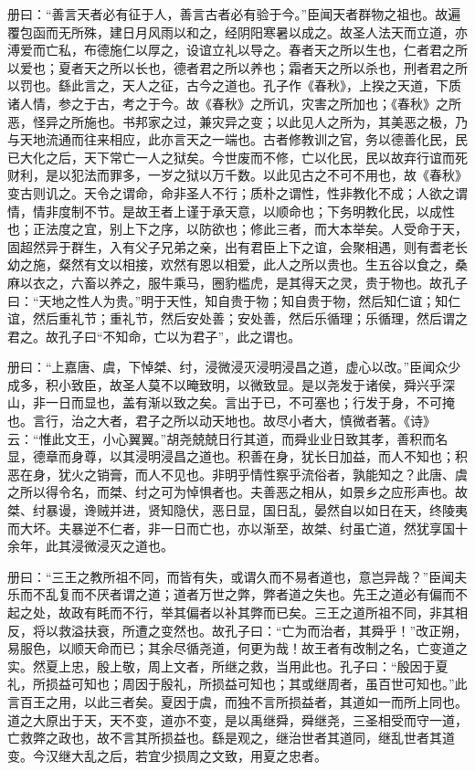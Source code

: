 \documentclass[]{article}
\begin{document}
册曰：``善言天者必有征于人，善言古者必有验于今。''臣闻天者群物之祖也。故遍覆包函而无所殊，建日月风雨以和之，经阴阳寒暑以成之。故圣人法天而立道，亦溥爱而亡私，布德施仁以厚之，设谊立礼以导之。春者天之所以生也，仁者君之所以爱也；夏者天之所以长也，德者君之所以养也；霜者天之所以杀也，刑者君之所以罚也。繇此言之，天人之征，古今之道也。孔子作《春秋》，上揆之天道，下质诸人情，参之于古，考之于今。故《春秋》之所讥，灾害之所加也；《春秋》之所恶，怪异之所施也。书邦家之过，兼灾异之变；以此见人之所为，其美恶之极，乃与天地流通而往来相应，此亦言天之一端也。古者修教训之官，务以德善化民，民已大化之后，天下常亡一人之狱矣。今世废而不修，亡以化民，民以故弃行谊而死财利，是以犯法而罪多，一岁之狱以万千数。以此见古之不可不用也，故《春秋》变古则讥之。天令之谓命，命非圣人不行；质朴之谓性，性非教化不成；人欲之谓情，情非度制不节。是故王者上谨于承天意，以顺命也；下务明教化民，以成性也；正法度之宜，别上下之序，以防欲也；修此三者，而大本举矣。人受命于天，固超然异于群生，入有父子兄弟之亲，出有君臣上下之谊，会聚相遇，则有耆老长幼之施，粲然有文以相接，欢然有恩以相爱，此人之所以贵也。生五谷以食之，桑麻以衣之，六畜以养之，服牛乘马，圈豹槛虎，是其得天之灵，贵于物也。故孔子曰：``天地之性人为贵。''明于天性，知自贵于物；知自贵于物，然后知仁谊；知仁谊，然后重礼节；重礼节，然后安处善；安处善，然后乐循理；乐循理，然后谓之君之。故孔子曰``不知命，亡以为君子''，此之谓也。

册曰：``上嘉唐、虞，下悼桀、纣，浸微浸灭浸明浸昌之道，虚心以改。''臣闻众少成多，积小致臣，故圣人莫不以晻致明，以微致显。是以尧发于诸侯，舜兴乎深山，非一日而显也，盖有渐以致之矣。言出于已，不可塞也；行发于身，不可掩也。言行，治之大者，君子之所以动天地也。故尽小者大，慎微者著。《诗》云：``惟此文王，小心翼翼。''胡尧兢兢日行其道，而舜业业日致其孝，善积而名显，德章而身尊，以其浸明浸昌之道也。积善在身，犹长日加益，而人不知也；积恶在身，犹火之销膏，而人不见也。非明乎情性察乎流俗者，孰能知之？此唐、虞之所以得令名，而桀、纣之可为悼惧者也。夫善恶之相从，如景乡之应形声也。故桀、纣暴谩，谗贼并进，贤知隐伏，恶日显，国日乱，晏然自以如日在天，终陵夷而大坏。夫暴逆不仁者，非一日而亡也，亦以渐至，故桀、纣虽亡道，然犹享国十余年，此其浸微浸灭之道也。

册曰：``三王之教所祖不同，而皆有失，或谓久而不易者道也，意岂异哉？''臣闻夫乐而不乱复而不厌者谓之道；道者万世之弊，弊者道之失也。先王之道必有偏而不起之处，故政有眊而不行，举其偏者以补其弊而已矣。三王之道所祖不同，非其相反，将以救溢扶衰，所遭之变然也。故孔子曰：``亡为而治者，其舜乎！''改正朔，易服色，以顺天命而已；其余尽循尧道，何更为哉！故王者有改制之名，亡变道之实。然夏上忠，殷上敬，周上文者，所继之救，当用此也。孔子曰：``殷因于夏礼，所损益可知也；周因于殷礼，所损益可知也；其或继周者，虽百世可知也。''此言百王之用，以此三者矣。夏因于虞，而独不言所损益者，其道如一而所上同也。道之大原出于天，天不变，道亦不变，是以禹继舜，舜继尧，三圣相受而守一道，亡救弊之政也，故不言其所损益也。繇是观之，继治世者其道同，继乱世者其道变。今汉继大乱之后，若宜少损周之文致，用夏之忠者。
\end{document}
